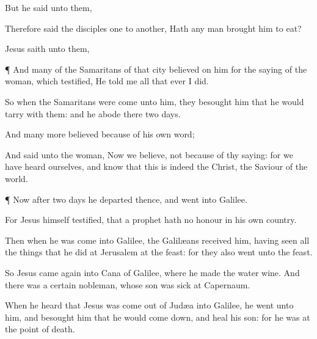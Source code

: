 {But he
said unto
them,
{}

Therefore
said the
disciples
one
to
another,
Hath any
man
brought
him
{} to
eat?

Jesus
saith unto
them,
{}






\par }{\PP {}¶
And
many
of the
Samaritans of
that
city
believed
on
him
for the
saying of the
woman, which
testified, He
told
me
all that
ever I
did.

So
when the
Samaritans were
come
unto
him, they
besought
him that he would
tarry
with
them:
and he
abode
there
two
days.

And
many
more
believed
because
of his
own
word;

And
said unto the
woman,
Now we
believe,
not
because
of
thy
saying:
for we have
heard
{}
ourselves,
and
know
that
this
is
indeed the
Christ, the
Saviour of the
world.


\par }{\PP {}¶
Now
after
two
days he
departed
thence,
and
went
into
Galilee.

For
Jesus
himself
testified,
that a
prophet
hath
no
honour
in his
own
country.

Then
when he was
come
into
Galilee, the
Galilæans
received
him, having
seen all the
things
that he
did
at
Jerusalem
at the
feast:
for
they
also
went
unto the
feast.

So
Jesus
came
again
into
Cana of
Galilee,
where he
made the
water
wine.
And there
was a
certain
nobleman,
whose
son was
sick
at
Capernaum.

When
he
heard
that
Jesus was
come out
of
Judæa
into
Galilee, he
went
unto
him,
and
besought
him
that he would come
down,
and
heal
his
son:
for he was at the point
of
death.

}
